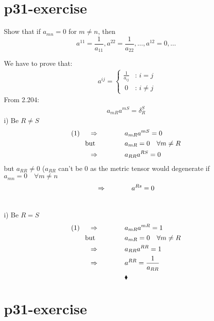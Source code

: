 \section{p31-exercise}

\begin{tcolorbox}
Show that if $a_{mn} = 0$ for $m\neq n$, then $$a^{11} = \frac{1}{a_{11}}, a^{22} = \frac{1}{a_{22}}, \dots, a^{12} = 0, \dots$$
\end{tcolorbox}
We have to prove that:
\begin{align*}
\ a^{ij} = \left\{\begin{array}{cc}
\frac{1}{a_{ij}} & \text{: }i=j\\
\ 0 & \text{: }i \neq j
\end{array}\right.
\end{align*}
From 2.204:
\begin{align}
a_{mR}a^{mS} = \delta^S_R
\end{align}
i) Be $R \neq S$
\begin{align*}
\text{(1) }\quad \Rightarrow \quad\quad\quad\quad &a_{mR}a^{mS} = 0\\
\text{but } \quad\quad\quad\quad &a_{mR} =0\quad \forall m \neq R\\
\Rightarrow \quad\quad\quad\quad &a_{RR}a^{RS} = 0
\end{align*}
but $a_{RR} \neq 0$ ($a_{RR}$ can't be $0$ as the metric tensor would degenerate  if $a_{mn} = 0\quad \forall m \neq n$
\begin{align*}
\Rightarrow \quad\quad\quad\quad &a^{Rs} = 0\\\\
\end{align*}

i) Be $R = S$
\begin{align*}
\text{(1) }\quad \Rightarrow \quad\quad\quad\quad & a_{mR}a^{mR} = 1\\
\text{but } \quad\quad\quad\quad &a_{mR} =0\quad \forall m \neq R\\
\Rightarrow \quad\quad\quad\quad &a_{RR}a^{RR} = 1\\
\Rightarrow \quad\quad\quad\quad &a^{RR} = \frac{1}{a_{RR}}
\end{align*}
$$\blacklozenge$$
\newpage

\section{p31-exercise}

